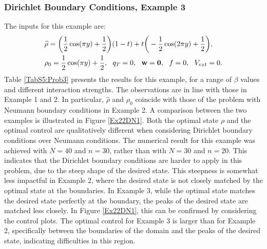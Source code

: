 \subsubsection{Dirichlet Boundary Conditions, Example 3} 
The inputs for this example are:
\begin{align*}
&\widehat \rho = \bigg(\frac{1}{2}\cos(\pi y) + \frac{1}{2}\bigg)(1-t) + t\bigg(-\frac{1}{2}\cos(2 \pi y) + \frac{1}{2}\bigg),\\
&\rho_{0} = \frac{1}{2}\cos(\pi y) + \frac{1}{2},\ \
q_{T} = 0,\ \
\mathbf{w} = \mathbf{0},\ \
f =0,\ \
V_{ext} =0.
\end{align*}
Table \ref{TabS5:Prob3} presents the results for this example, for a range of $\beta$ values and different interaction strengths. The observations are in line with those in Example 1 and 2. In particular, $ \widehat \rho$ and $\rho_0$ coincide with those of the problem with Neumann boundary conditions in Example 2. A comparison between the two examples is illustrated in Figure \ref{Ex22DN1}. Both the optimal state $\rho$ and the optimal control are qualitatively different when considering Dirichlet boundary conditions over Neumann conditions. The numerical result for this example was achieved with $N=40$ and $n = 30$, rather than with $N=30$ and $n=20$. This indicates that the Dirichlet boundary conditions are harder to apply in this problem, due to the steep shape of the desired state. This steepness is somewhat less impactful in Example 2, where the desired state is not closely matched by the optimal state at the boundaries. In Example 3, while the optimal state matches the desired state perfectly at the boundary, the peaks of the desired state are matched less closely. In Figure \ref{Ex22DN1}, this can be confirmed by considering the control plots. The optimal control for Example 3 is larger than for Example 2, specifically between the boundaries of the domain and the peaks of the desired state, indicating difficulties in this region.


